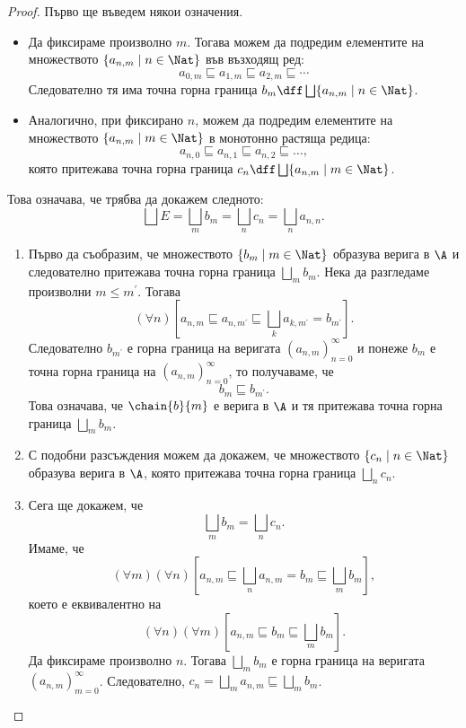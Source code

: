 \begin{proof}
  Първо ще въведем някои означения.
  \begin{itemize}
  \item 
    Да фиксираме произволно $m$. Тогава можем да подредим елементите на множеството $\{a_{n,m} \mid n \in \Nat\}$ във възходящ ред: 
    \[a_{0,m} \sqsubseteq a_{1,m} \sqsubseteq a_{2,m} \sqsubseteq \cdots\]
    Следователно тя има точна горна граница $b_m \dff \bigsqcup \{a_{n,m} \mid n \in \Nat\}$.
  \item
    Аналогично, при фиксирано $n$, можем да подредим елементите на множеството $\{a_{n,m} \mid m \in \Nat\}$ в монотонно растяща редица:
    \[a_{n,0} \sqsubseteq a_{n,1} \sqsubseteq a_{n,2} \sqsubseteq \ldots,\]
    която притежава точна горна граница $c_n \dff \bigsqcup \{a_{n,m} \mid m \in \Nat\}$.
  \end{itemize}
  Това означава, че трябва да докажем следното:
  \[\bigsqcup E = \bigsqcup_mb_m = \bigsqcup_n c_n = \bigsqcup_n a_{n,n}.\]
  \begin{enumerate}[1)]
  \item 
    Първо да съобразим, че множеството $\{b_m \mid m \in \Nat\}$ образува верига в $\A$ и следователно притежава точна горна граница $\bigsqcup_m b_m$.
    Нека да разгледаме произволни $m \leq m^\prime$.
    Тогава \[(\forall n)[a_{n,m} \sqsubseteq a_{n,m^\prime} \sqsubseteq \bigsqcup_k a_{k,m^\prime} = b_{m^\prime}].\]
    Следователно $b_{m^\prime}$ е горна граница на веригата $(a_{n,m})^{\infty}_{n=0}$ и понеже $b_m$ е точна горна граница на $(a_{n,m})^{\infty}_{n=0}$, то получаваме, че \[b_m \sqsubseteq b_{m^\prime}.\]
    Това означава, че $\chain{b}{m}$ е верига в $\A$ и тя притежава точна горна граница $\bigsqcup_m b_m$.  
  \item
    С подобни разсъждения можем да докажем, че множеството $\{c_n \mid n \in \Nat\}$ образува верига в $\A$, която притежава точна горна граница $\bigsqcup_n c_n$.
  \item
    Сега ще докажем, че \[\bigsqcup_m b_m = \bigsqcup_n c_n.\]
    Имаме, че 
    \[(\forall m)(\forall n)[a_{n,m} \sqsubseteq \bigsqcup_na_{n,m} = b_m \sqsubseteq \bigsqcup_m b_m],\]
    което е еквивалентно на 
    \[(\forall n)(\forall m)[a_{n,m} \sqsubseteq b_m \sqsubseteq \bigsqcup_m b_m].\]
    Да фиксираме произволно $n$.
    Тогава $\bigsqcup_m b_m$ е горна граница на веригата $(a_{n,m})^\infty_{m=0}$.
    Следователно, $c_n = \bigsqcup_m a_{n,m} \sqsubseteq \bigsqcup_m b_m$.

\end{enumerate}
\end{proof}
